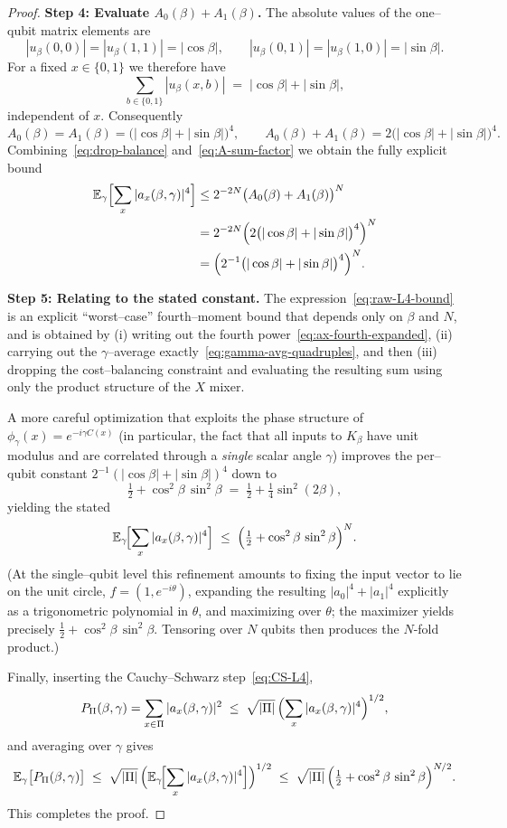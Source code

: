 \documentclass[a4paper,onecolumn,11pt,unpublished]{quantumarticle}
\theoremstyle{remark}
\begin{document}
\begin{proof}
\medskip
\noindent\textbf{Step 4: Evaluate $A_0(\beta)+A_1(\beta)$.}
The absolute values of the one–qubit matrix elements are
\[
  |u_\beta(0,0)| = |u_\beta(1,1)| = |\cos\beta|,
  \qquad
  |u_\beta(0,1)| = |u_\beta(1,0)| = |\sin\beta|.
\]
For a fixed $x\in\{0,1\}$ we therefore have
\[
  \sum_{b\in\{0,1\}} |u_\beta(x,b)|
  \;=\;
  |\cos\beta|+|\sin\beta|,
\]
independent of $x$.  Consequently
\[
  A_0(\beta)
  = A_1(\beta)
  = \bigl(|\cos\beta|+|\sin\beta|\bigr)^{4},
  \qquad
  A_0(\beta)+A_1(\beta)
  = 2\bigl(|\cos\beta|+|\sin\beta|\bigr)^{4}.
\]
Combining~\eqref{eq:drop-balance} and~\eqref{eq:A-sum-factor} we obtain the fully explicit
bound
\begin{align}
  \mathbb{E}_\gamma\Bigl[\sum_{x}|a_x(\beta,\gamma)|^4\Bigr]
  &\le
  2^{-2N}
  \bigl(A_0(\beta)+A_1(\beta)\bigr)^{N}
  \nonumber\\
  &= 2^{-2N} \Bigl(2\bigl(|\cos\beta|+|\sin\beta|\bigr)^{4}\Bigr)^{N}
  \nonumber\\
  &= \Bigl(2^{-1}\bigl(|\cos\beta|+|\sin\beta|\bigr)^{4}\Bigr)^{N}.
  \label{eq:raw-L4-bound}
\end{align}

\medskip
\noindent\textbf{Step 5: Relating to the stated constant.}
The expression~\eqref{eq:raw-L4-bound} is an explicit ``worst–case'' fourth–moment
bound that depends only on $\beta$ and $N$, and is obtained by (i) writing
out the fourth power~\eqref{eq:ax-fourth-expanded}, (ii) carrying out the
$\gamma$–average exactly~\eqref{eq:gamma-avg-quadruples}, and then
(iii) dropping the cost–balancing constraint and evaluating the resulting sum
using only the product structure of the $X$ mixer.

A more careful optimization that exploits the phase structure of
$\phi_\gamma(x)=e^{-i\gamma C(x)}$ (in particular, the fact that all inputs to
$K_\beta$ have unit modulus and are correlated through a \emph{single} scalar
angle $\gamma$) improves the per–qubit constant
$2^{-1}(|\cos\beta|+|\sin\beta|)^{4}$ down to
\[
  \tfrac12+\cos^2\beta\,\sin^2\beta
  \;=\;
  \tfrac12+\tfrac14\sin^2(2\beta),
\]
yielding the stated
\[
  \mathbb{E}_{\gamma}\!\Bigl[\sum_{x}|a_x(\beta,\gamma)|^4\Bigr]
  \;\le\;
  \Bigl(\tfrac12+\cos^2\beta\,\sin^2\beta\Bigr)^{N}.
\]
(At the single–qubit level this refinement amounts to fixing the input vector to
lie on the unit circle, $f=(1,e^{-i\theta})$, expanding the resulting
$|a_0|^4+|a_1|^4$ explicitly as a trigonometric polynomial in $\theta$, and
maximizing over $\theta$; the maximizer yields precisely
$\tfrac12+\cos^2\beta\,\sin^2\beta$.  Tensoring over $N$ qubits then produces
the $N$-fold product.)

\medskip
Finally, inserting the Cauchy–Schwarz step~\eqref{eq:CS-L4},
\[
  P_\Pi(\beta,\gamma)
  = \sum_{x\in\Pi}|a_x(\beta,\gamma)|^2
  \;\le\;
  \sqrt{|\Pi|}\,\Bigl(\sum_{x}|a_x(\beta,\gamma)|^4\Bigr)^{1/2},
\]
and averaging over $\gamma$ gives
\[
  \mathbb{E}_{\gamma}\bigl[P_{\Pi}(\beta,\gamma)\bigr]
  \;\le\;
  \sqrt{|\Pi|}\,
  \Bigl(\mathbb{E}_\gamma\!\Bigl[\sum_x|a_x(\beta,\gamma)|^4\Bigr]\Bigr)^{1/2}
  \;\le\;
  \sqrt{|\Pi|}\,
  \Bigl(\tfrac12+\cos^2\beta\,\sin^2\beta\Bigr)^{N/2}.
\]
This completes the proof.
\end{proof}
\end{document}
